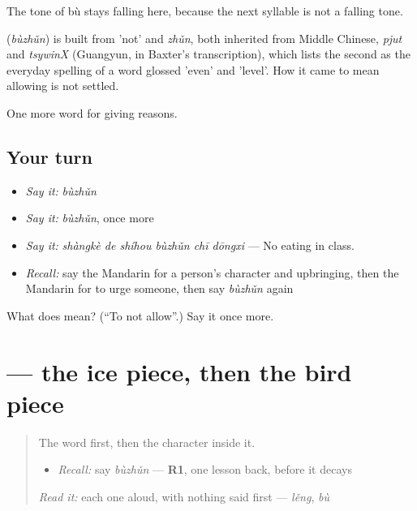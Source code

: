 The tone of bù stays falling here, because the next syllable is not a falling tone.

\begin{cousinweb}
\textbf{} (\emph{bùzhǔn}) is built from  'not' and \emph{zhǔn}, both inherited from Middle Chinese, \emph{pjut} and \emph{tsywinX} (Guangyun, in Baxter's transcription), which lists the second as the everyday spelling of a word glossed 'even' and 'level'. How it came to mean allowing is not settled.
\end{cousinweb}

\begin{grammarlens}[title={What you've built}]
One more word for giving reasons.
\end{grammarlens}

\subsection*{Your turn}
\begin{itemize}
\raggedright
  \item \emph{Say it:} \emph{bùzhǔn}
  \item \emph{Say it:} \emph{bùzhǔn}, once more
  \item \emph{Say it:} \emph{shàngkè de shíhou bùzhǔn chī dōngxi} — No eating in class.
  \item \emph{Recall:} say the Mandarin for a person's character and upbringing, then the Mandarin for to urge someone, then say \emph{bùzhǔn} again
\end{itemize}

\begin{tcolorbox}[breakable,colback=teal!4,colframe=teal!35!black,title={Before you move on}]
What does  mean? (\textquotedblleft{}To not allow\textquotedblright{}.) Say it once more.
\end{tcolorbox}
\section[\texorpdfstring{\zh{准} (zhǔn)}{准 (zhǔn)}]{ — the ice piece, then the bird piece}

\label{lesson:ZH-W364-zhun-allow}



\begin{quote}
The word first, then the character inside it.

\begin{itemize}
\raggedright
  \item \emph{Recall:} say \emph{bùzhǔn} — \textbf{R1}, one lesson back, before it decays
\end{itemize}

\begin{quote}
 
\end{quote}

\emph{Read it:} each one aloud, with nothing said first — \emph{lěng}, \emph{bù}
\end{quote}

